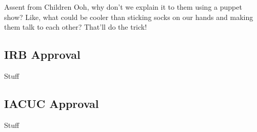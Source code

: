 \documentclass {beamer}
\begin{document}
\begin{frame}{Assent from Children}
	Ooh, why don't we explain it to them using a puppet show? Like, what could be cooler than sticking socks on our hands and making them talk to each other? That'll do the trick!
\end{frame}

\subsection{IRB Approval}

\begin{frame}{Stuff}

\end{frame}

\subsection{IACUC Approval}

\begin{frame}{Stuff}

\end{frame}
\end{document}
